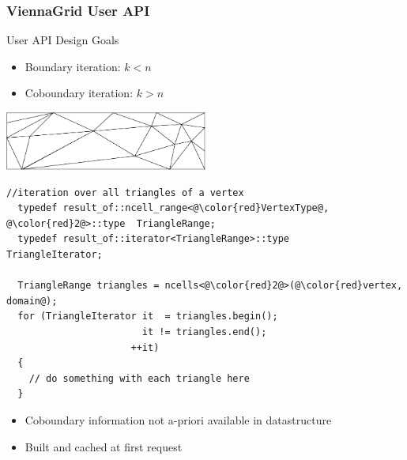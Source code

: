  
\begin{frame}[fragile]
\frametitle{ViennaGrid User API}
 \begin{block}{User API Design Goals}
  \begin{itemize}
   \item Boundary iteration: $k < n$
   \item Coboundary iteration: $k > n$
  \end{itemize}
  
  \begin{flushright}
   \vspace*{-2cm}
   \includegraphics[width=0.5\textwidth]{figures/mesh.pdf}
  \end{flushright}


  \begin{lstlisting}[basicstyle=\scriptsize\ttfamily,escapechar=@]
  //iteration over all triangles of a vertex
  typedef result_of::ncell_range<@\color{red}VertexType@, @\color{red}2@>::type  TriangleRange;
  typedef result_of::iterator<TriangleRange>::type     TriangleIterator;
  
  TriangleRange triangles = ncells<@\color{red}2@>(@\color{red}vertex, domain@);
  for (TriangleIterator it  = triangles.begin();
                        it != triangles.end();
                      ++it)
  {
    // do something with each triangle here
  }
  \end{lstlisting} 

   \begin{itemize}
    \item Coboundary information not a-priori available in datastructure
    \item Built and cached at first request
   \end{itemize}
 \end{block}
 \vspace*{0.45cm}
\end{frame}
 


